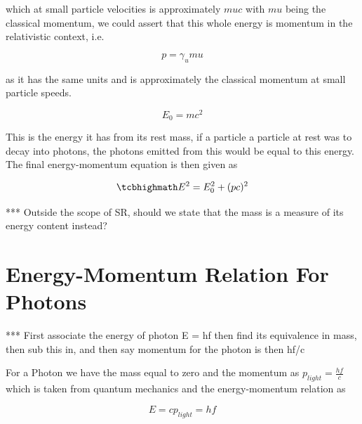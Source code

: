 which at small particle velocities is approximately $muc$ with $mu$ being the classical momentum, we could assert that this whole energy is momentum in the relativistic context, i.e.

\begin{equation}
	p = \gamma_{u} mu
\end{equation}

as it has the same units and is approximately the classical momentum at small particle speeds.

\begin{equation}
	E_0 = mc^2
\end{equation}

This is the energy it has from its rest mass, if a particle a particle at rest was to decay into photons, the photons emitted from this would be equal to this energy.
The final energy-momentum equation is then given as

\begin{equation}
	\mhl{
		E^2 = E_0^2 + (pc)^2
	}
\end{equation}

*** Outside the scope of SR, should we state that the mass is a measure of its energy content instead?



\section{Energy-Momentum Relation For Photons}

*** First associate the energy of photon E = hf then find its equivalence in mass, then sub this in, and then say momentum for the photon is then hf/c

For a Photon we have the mass equal to zero and the momentum as $p_{light} = \frac{hf}{c}$ which is taken from quantum mechanics and the energy-momentum relation as

\begin{equation}
	E = c p_{light} = hf
\end{equation}

